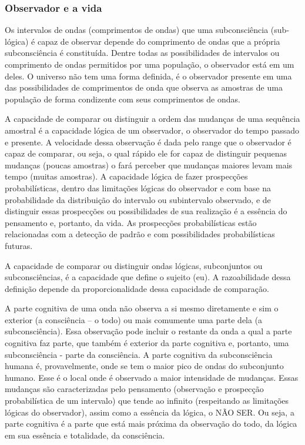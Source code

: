 \subsubsection{Observador e a vida}
Os intervalos de ondas (comprimentos de ondas) que uma subconsciência (sub-lógica) é capaz de observar depende do comprimento de ondas que a própria subconsciência é constituída. Dentre todas as possibilidades de intervalos ou comprimento de ondas permitidos por uma população, o observador está em um deles. O universo não tem uma forma definida, é o observador presente em uma das possibilidades de comprimentos de onda que observa as amostras de uma população de forma condizente com seus comprimentos de ondas.

A capacidade de comparar ou distinguir a ordem das mudanças de uma sequência amostral é a capacidade lógica de um observador, o observador do tempo passado e presente. A velocidade dessa observação é dada pelo range que o observador é capaz de comparar, ou seja, o qual rápido ele for capaz de distinguir pequenas mudanças (poucas amostras) o fará perceber que mudanças maiores levam mais tempo (muitas amostras). A capacidade lógica de fazer prospecções probabilísticas, dentro das limitações lógicas do observador e com base na probabilidade da distribuição do intervalo ou subintervalo observado, e de distinguir essas prospecções ou possibilidades de sua realização é a essência do pensamento e, portanto, da vida. As prospecções probabilísticas estão relacionadas com a detecção de padrão e com possibilidades probabilísticas futuras.

A capacidade de comparar ou distinguir ondas lógicas, subconjuntos ou subconsciências, é a capacidade que define o sujeito (eu). A razoabilidade dessa definição depende da proporcionalidade dessa capacidade de comparação.

A parte cognitiva de uma onda não observa a si mesmo diretamente e sim o exterior (a consciência – o todo) ou mais comumente uma parte dela (a subconsciência). Essa observação pode incluir o restante da onda a qual a parte cognitiva faz parte, que também é exterior da parte cognitiva e, portanto, uma subconsciência - parte da consciência. A parte cognitiva da subconsciência humana é, provavelmente, onde se tem o maior pico de ondas do subconjunto humano. Esse é o local onde é observado a maior intensidade de mudanças. Essas mudanças são caracterizadas pelo pensamento (observação e prospecção probabilística de um intervalo) que tende ao infinito (respeitando as limitações lógicas do observador), assim como a essência da lógica, o NÃO SER. Ou seja, a parte cognitiva é a parte que está mais próxima da observação do todo, da lógica em sua essência e totalidade, da consciência.

